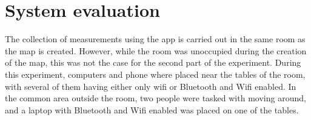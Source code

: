\section{System evaluation}\label{sec:experiment_results}
The collection of measurements using the app is carried out in the same room as the map is created. 
However, while the room was unoccupied during the creation of the map, this was not the case for the 
second part of the experiment. 
During this experiment, computers and phone where placed near the tables of the room, with several of them having either only wifi or Bluetooth and Wifi enabled. 
In the common area outside the room, two people were tasked with moving around, and a laptop with Bluetooth and Wifi enabled was placed on one of the tables.
\begin{table}[H]
    \caption{Evaluation results from Samsung Galaxy A53 showing the number of correct classifications out of a possible ten for each k-value}
    \label{lst:resultsPhone}
\end{table}

